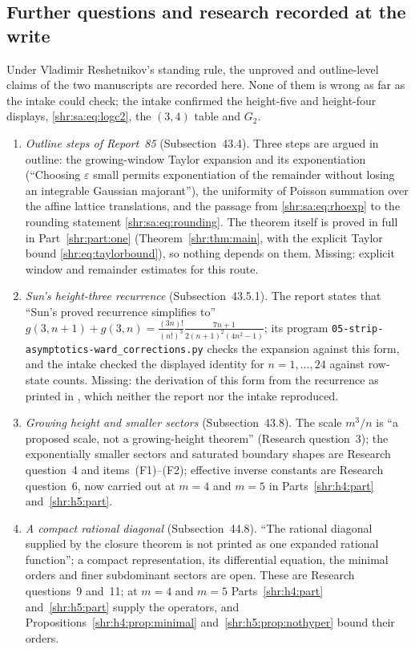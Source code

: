 \documentclass[11pt,letterpaper]{article}
\numberwithin{equation}{section}
\theoremstyle{definition}
\newcommand{\1}{\mathbf 1}
\begin{document}
\subsection{Further questions and research recorded at the write}
\label{shr:sa:sec:further}
Under Vladimir Reshetnikov's standing rule, the unproved and outline-level
claims of the two manuscripts are recorded here. None of them is wrong as
far as the intake could check; the intake confirmed the height-five and
height-four displays, \eqref{shr:sa:eq:logc2}, the $(3,4)$ table and
$G_2$.
\begin{enumerate}[label=(F\arabic*),leftmargin=*,start=11]
\item \emph{Outline steps of Report~85} (Subsection~43.4). Three steps are
argued in outline: the growing-window Taylor expansion and its
exponentiation (``Choosing $\varepsilon$ small permits exponentiation of the
remainder without losing an integrable Gaussian majorant''), the uniformity
of Poisson summation over the affine lattice translations, and the passage
from \eqref{shr:sa:eq:rhoexp} to the rounding statement
\eqref{shr:sa:eq:rounding}. The theorem itself is proved in full in
Part~\ref{shr:part:one} (Theorem~\ref{shr:thm:main}, with the explicit
Taylor bound \eqref{shr:eq:taylorbound}), so nothing depends on them.
Missing: explicit window and remainder estimates for this route.
\item \emph{Sun's height-three recurrence} (Subsection~43.5.1). The report
states that ``Sun's proved recurrence simplifies to''
$g(3,n+1)+g(3,n)=\frac{(3n)!}{(n!)^3}\frac{7n+1}{2(n+1)^2(4n^2-1)}$; its
program \texttt{05-\allowbreak strip-\allowbreak asymptotics-\allowbreak ward\_\allowbreak corrections.py} checks the
expansion against this form, and the intake checked the displayed identity
for $n=1,\ldots,24$ against row-state counts. Missing: the derivation of
this form from the recurrence as printed in \cite{Sun}, which neither the
report nor the intake reproduced.
\item \emph{Growing height and smaller sectors} (Subsection~43.8). The scale
$m^3/n$ is ``a proposed scale, not a growing-height theorem'' (Research
question~3); the exponentially smaller sectors and saturated boundary shapes
are Research question~4 and items~(F1)--(F2); effective inverse constants
are Research question~6, now carried out at $m=4$ and $m=5$ in
Parts~\ref{shr:h4:part} and~\ref{shr:h5:part}.
\item \emph{A compact rational diagonal} (Subsection~44.8). ``The rational
diagonal supplied by the closure theorem is not printed as one expanded
rational function''; a compact representation, its differential equation,
the minimal orders and finer subdominant sectors are open. These are
Research questions~9 and~11; at $m=4$ and $m=5$ Parts~\ref{shr:h4:part}
and~\ref{shr:h5:part} supply the operators, and
Propositions~\ref{shr:h4:prop:minimal} and~\ref{shr:h5:prop:nothyper}
bound their orders.
\end{enumerate}
\end{document}
